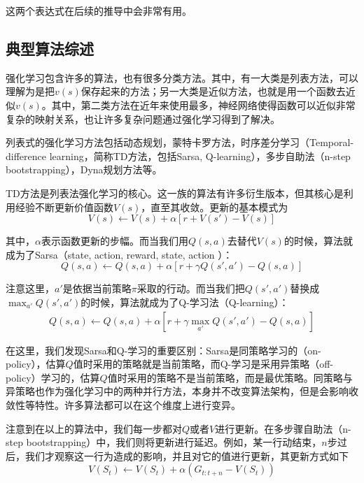     \par 这两个表达式在后续的推导中会非常有用。
    
    \subsection{典型算法综述}
      强化学习包含许多的算法，也有很多分类方法。其中，有一大类是列表方法，可以理解为是把$v(s)$保存起来的方法；另一大类是近似方法，也就是用一个函数去近似$v(s)$\cite{Sutton_book}。其中，第二类方法在近年来使用最多，神经网络使得函数可以近似非常复杂的映射关系，也让许多复杂问题通过强化学习得到了解决。\par
      列表式的强化学习方法包括动态规划\cite{Bellman_DP}，蒙特卡罗方法，时序差分学习（Temporal-difference learning，简称TD方法，包括Sarsa\cite{Sutton_book}, Q-learning\cite{Q_learning}）\cite{Sutton_problem_formulation}，多步自助法\cite{n_step_bootstrapping}（n-step bootstrapping），Dyna规划方法\cite{Sutton_book}等。\par
      TD方法是列表法强化学习的核心。这一族的算法有许多衍生版本，但其核心是利用经验不断更新价值函数$V(s)$，直至其收敛。更新的基本模式为
      $$ V(s) \gets V(s) + \alpha [r + V(s') - V(s)] $$
      \par 其中，$\alpha$表示函数更新的步幅。而当我们用$Q(s, a)$去替代$V(s)$的时候，算法就成为了Sarsa（state, action, reward, state, action \cite{deepRL_overview}）：
      $$ Q(s, a) \gets Q(s, a) + \alpha [r + \gamma Q(s', a') - Q(s, a)] $$
      \par 注意这里，$a'$是依据当前策略$\pi$采取的行动。而当我们把$Q(s', a')$替换成$\max_{a'} Q(s', a')$的时候，算法就成为了Q-学习法（Q-learning）：
      \begin{align}
      \label{eq:Q_learning}
        Q(s, a) \gets Q(s, a) + \alpha [r + \gamma \max_{a'} Q(s', a') - Q(s, a)]
      \end{align}
      \par 在这里，我们发现Sarsa和Q-学习的重要区别：Sarsa是同策略学习的（on-policy），估算$Q$值时采用的策略就是当前策略，而Q-学习是采用异策略（off-policy）学习的，估算$Q$值时采用的策略不是当前策略，而是最优策略。同策略与异策略也作为强化学习中的两种并行方法，本身并不改变算法架构，但是会影响收敛性等特性。许多算法都可以在这个维度上进行变异。\par
      注意到在以上的算法中，我们每一步都对$Q$或者$V$进行更新。在多步骤自助法（n-step bootstrapping）中，我们则将更新进行延迟。例如，某一行动结束，$n$步过后，我们才观察这一行为造成的影响，并且对它的值进行更新，其更新方式如下
      $$ V(S_t) \gets V(S_t) + \alpha(G_{t:t+n} - V(S_t)) $$
